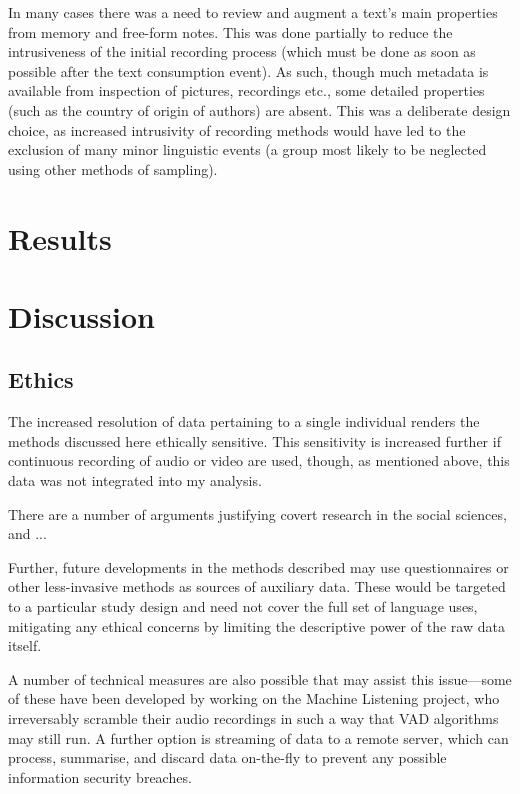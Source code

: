 In many cases there was a need to review and augment a text's main properties from memory and free-form notes.  This was done partially to reduce the intrusiveness of the initial recording process (which must be done as soon as possible after the text consumption event).  As such, though much metadata is available from inspection of pictures, recordings etc., some detailed properties (such as the country of origin of authors) are absent.  This was a deliberate design choice, as increased intrusivity of recording methods would have led to the exclusion of many minor linguistic events (a group most likely to be neglected using other methods of sampling).



\section{Results}

\section{Discussion}





\subsection{Ethics}
The increased resolution of data pertaining to a single individual renders the methods discussed here ethically sensitive.  This sensitivity is increased further if continuous recording of audio or video are used, though, as mentioned above, this data was not integrated into my analysis.

There are a number of arguments justifying covert research in the social sciences, and ...




Further, future developments in the methods described may use questionnaires or other less-invasive methods as sources of auxiliary data.  These would be targeted to a particular study design and need not cover the full set of language uses, mitigating any ethical concerns by limiting the descriptive power of the raw data itself.

A number of technical measures are also possible that may assist this issue---some of these have been developed by  working on the Machine Listening project, who irreversably scramble their audio recordings in such a way that VAD algorithms may still run.  A further option is streaming of data to a remote server, which can process, summarise, and discard data on-the-fly to prevent any possible information security breaches.






